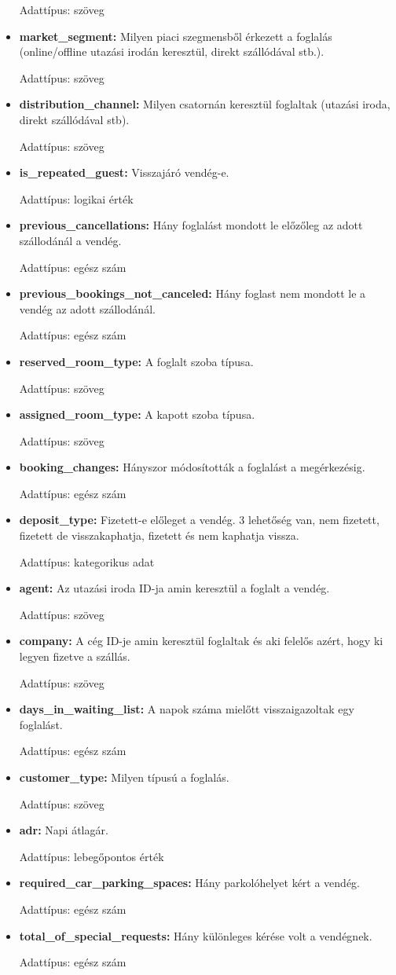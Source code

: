 \begin{itemize}
    Adattípus: szöveg
    \item \textbf{market\_segment:} Milyen piaci szegmensből érkezett a foglalás (online/offline utazási irodán keresztül, direkt szállódával stb.). 
    
    Adattípus: szöveg
    \item \textbf{distribution\_channel:} Milyen csatornán keresztül foglaltak (utazási iroda, direkt szállódával stb). 
    
    Adattípus: szöveg
    \item \textbf{is\_repeated\_guest:} Visszajáró vendég-e. 
    
    Adattípus: logikai érték
    \item \textbf{previous\_cancellations:} Hány foglalást mondott le előzőleg az adott szállodánál a vendég. 
    
    Adattípus: egész szám
    \item \textbf{previous\_bookings\_not\_canceled:} Hány foglast nem mondott le a vendég az adott szállodánál. 
    
    Adattípus: egész szám
    \item \textbf{reserved\_room\_type:} A foglalt szoba típusa. 
    
    Adattípus: szöveg
    \item \textbf{assigned\_room\_type:} A kapott szoba típusa. 
    
    Adattípus: szöveg
    \item \textbf{booking\_changes:} Hányszor módosították a foglalást a megérkezésig. 
    
    Adattípus: egész szám
    \item \textbf{deposit\_type:} Fizetett-e előleget a vendég. 3 lehetőség van, nem fizetett, fizetett de visszakaphatja, fizetett és nem kaphatja vissza. 
    
    Adattípus: kategorikus adat
    \item \textbf{agent:} Az utazási iroda ID-ja amin keresztül a foglalt a vendég. 
    
    Adattípus: szöveg
    \item \textbf{company:} A cég ID-je amin keresztül foglaltak és aki felelős azért, hogy ki legyen fizetve a szállás. 
    
    Adattípus: szöveg
    \item \textbf{days\_in\_waiting\_list:} A napok száma mielőtt visszaigazoltak egy foglalást.
    
    Adattípus: egész szám
    \item \textbf{customer\_type:} Milyen típusú a foglalás. 
    
    Adattípus: szöveg
    \item \textbf{adr:} Napi átlagár. 
    
    Adattípus: lebegőpontos érték
    \item \textbf{required\_car\_parking\_spaces:} Hány parkolóhelyet kért a vendég. 
    
    Adattípus: egész szám
    \item \textbf{total\_of\_special\_requests:} Hány különleges kérése volt a vendégnek. 
    
    Adattípus: egész szám
\end{itemize}

